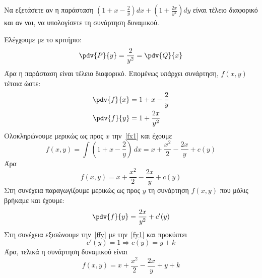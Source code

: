 \begin{example}
  Να εξετάσετε αν η παράσταση $ \left(1+x- \frac{2}{y}\right)dx + 
  \left(1+ \frac{2x}{y^{2}} \right)dy $ είναι τέλειο διαφορικό και αν ναι, να 
  υπολογίσετε τη συνάρτηση δυναμικού.
\end{example}
\begin{solution}
  Ελέγχουμε με το κριτήριο:
  \[ 
    \pdv{P}{y} = \frac{2}{y^{2}} = \pdv{Q}{x} 
  \]
  Άρα η παράσταση είναι τέλειο διαφορικό. Επομένως υπάρχει 
  συνάρτηση, $ f(x,y) $ τέτοια ώστε: 
  \begin{align}
    \pdv{f}{x} &= 1 + x - \frac{2}{y} \label{fx1} \\
    \pdv{f}{y} &= 1+ \frac{2x}{y^{2}} \label{fy1}
  \end{align}
  Ολοκληρώνουμε μερικώς ως προς $x$ την~\eqref{fx1} και έχουμε
  \[
    f(x,y) = \int \left(1+x- \frac{2}{y}\right) \,{dx} = x + 
    \frac{x^{2}}{2} - \frac{2x}{y} + c(y) 
  \] 
  Άρα  
  \begin{equation}
    f(x,y) = x + \frac{x^{2}}{2} - \frac{2x}{y} + c(y) \label{fxy}
  \end{equation}
  Στη συνέχεια παραγωγίζουμε μερικώς ως προς $y$ τη συνάρτηση $ f(x,y) $ που μόλις 
  βρήκαμε και έχουμε:
  \begin{equation}
    \pdv{f}{y} = \frac{2x}{y^{2}} + c'(y) \label{ffy}
  \end{equation} 
  Στη συνέχεια εξισώνουμε την~\eqref{ffy} με την~\eqref{fy1} και προκύπτει
  \[
    c'(y) = 1 \Rightarrow c(y) = y + k 
  \] 
  Άρα, τελικά η συνάρτηση δυναμικού είναι 
  \[
    f(x,y) = x + \frac{x^{2}}{2} - \frac{2x}{y} + y + k 
  \] 
\end{solution}

